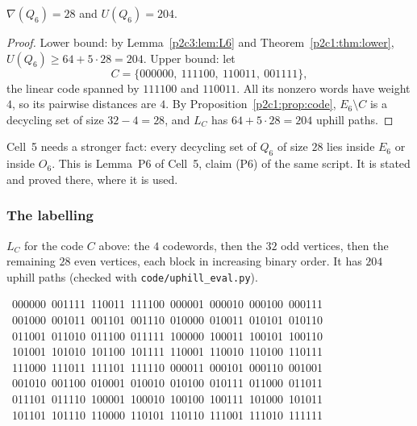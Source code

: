 \begin{theorem}\label{p2c3:thm:main}
$\nabla(Q_6)=28$ and $U(Q_6)=204$.
\end{theorem}

\begin{proof}
Lower bound: by Lemma~\ref{p2c3:lem:L6} and Theorem~\ref{p2c1:thm:lower},
$U(Q_6)\ge64+5\cdot28=204$. Upper bound: let
\[
  C=\{000000,\ 111100,\ 110011,\ 001111\},
\]
the linear code spanned by $111100$ and $110011$. All its nonzero words have weight $4$, so its
pairwise distances are $4$. By Proposition~\ref{p2c1:prop:code}, $E_6\setminus C$ is a decycling
set of size $32-4=28$, and $L_C$ has $64+5\cdot28=204$ uphill paths.
\end{proof}

\begin{remark}\label{p2c3:rem:parity}
Cell~5 needs a stronger fact: every decycling set of $Q_6$ of size $28$ lies inside $E_6$ or
inside $O_6$. This is Lemma~P6 of Cell~5, claim (P6) of the same script. It is stated and
proved there, where it is used.
\end{remark}

\subsubsection{The labelling}\label{p2c3:sec:lab}

$L_C$ for the code $C$ above: the $4$ codewords, then the $32$ odd vertices, then the remaining
$28$ even vertices, each block in increasing binary order. It has $204$ uphill paths (checked with
\texttt{code/uphill\_eval.py}).
\begin{flushleft}\small\ttfamily
{}\ 000000\ 001111\ 110011\ 111100\ 000001\ 000010\ 000100\ 000111\\
\ 001000\ 001011\ 001101\ 001110\ 010000\ 010011\ 010101\ 010110\\
\ 011001\ 011010\ 011100\ 011111\ 100000\ 100011\ 100101\ 100110\\
\ 101001\ 101010\ 101100\ 101111\ 110001\ 110010\ 110100\ 110111\\
\ 111000\ 111011\ 111101\ 111110\ 000011\ 000101\ 000110\ 001001\\
\ 001010\ 001100\ 010001\ 010010\ 010100\ 010111\ 011000\ 011011\\
\ 011101\ 011110\ 100001\ 100010\ 100100\ 100111\ 101000\ 101011\\
\ 101101\ 101110\ 110000\ 110101\ 110110\ 111001\ 111010\ 111111\\
\end{flushleft}

